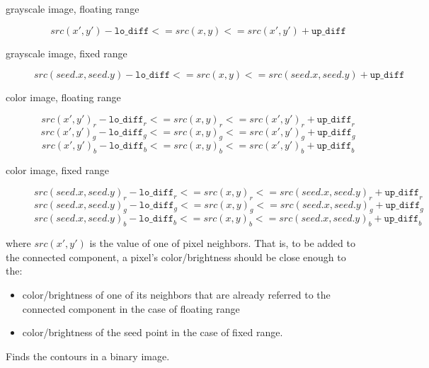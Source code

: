 \begin{description}

\item[grayscale image, floating range] \[
src(x',y')-\texttt{lo\_diff} <= src(x,y) <= src(x',y')+\texttt{up\_diff} \]

\item[grayscale image, fixed range] \[
src(seed.x,seed.y)-\texttt{lo\_diff}<=src(x,y)<=src(seed.x,seed.y)+\texttt{up\_diff} \]

\item[color image, floating range]
\[ src(x',y')_r-\texttt{lo\_diff}_r<=src(x,y)_r<=src(x',y')_r+\texttt{up\_diff}_r \]
\[ src(x',y')_g-\texttt{lo\_diff}_g<=src(x,y)_g<=src(x',y')_g+\texttt{up\_diff}_g \]
\[ src(x',y')_b-\texttt{lo\_diff}_b<=src(x,y)_b<=src(x',y')_b+\texttt{up\_diff}_b \]

\item[color image, fixed range]
\[ src(seed.x,seed.y)_r-\texttt{lo\_diff}_r<=src(x,y)_r<=src(seed.x,seed.y)_r+\texttt{up\_diff}_r \]
\[ src(seed.x,seed.y)_g-\texttt{lo\_diff}_g<=src(x,y)_g<=src(seed.x,seed.y)_g+\texttt{up\_diff}_g \]
\[ src(seed.x,seed.y)_b-\texttt{lo\_diff}_b<=src(x,y)_b<=src(seed.x,seed.y)_b+\texttt{up\_diff}_b \]
\end{description}

where $src(x',y')$ is the value of one of pixel neighbors. That is, to be added to the connected component, a pixel's color/brightness should be close enough to the:
\begin{itemize}
  \item color/brightness of one of its neighbors that are already referred to the connected component in the case of floating range
  \item color/brightness of the seed point in the case of fixed range.
\end{itemize}

\label{FindContours}

Finds the contours in a binary image.


